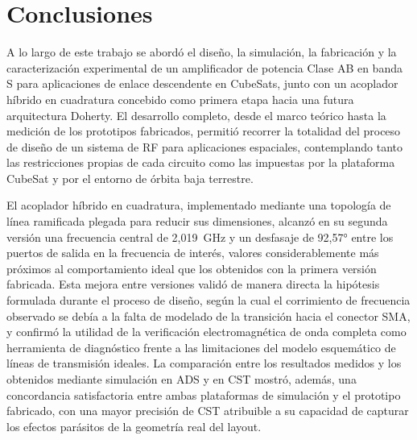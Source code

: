 \chapter[Conclusiones]{Conclusiones} \label{cp:conclusiones}

A lo largo de este trabajo se abordó el diseño, la simulación, la fabricación y la caracterización experimental de un amplificador de potencia Clase AB en banda S para aplicaciones de enlace descendente en CubeSats, junto con un acoplador híbrido en cuadratura concebido como primera etapa hacia una futura arquitectura Doherty. El desarrollo completo, desde el marco teórico hasta la medición de los prototipos fabricados, permitió recorrer la totalidad del proceso de diseño de un sistema de RF para aplicaciones espaciales, contemplando tanto las restricciones propias de cada circuito como las impuestas por la plataforma CubeSat y por el entorno de órbita baja terrestre.

El acoplador híbrido en cuadratura, implementado mediante una topología de línea ramificada plegada para reducir sus dimensiones, alcanzó en su segunda versión una frecuencia central de 2,019~GHz y un desfasaje de 92,57° entre los puertos de salida en la frecuencia de interés, valores considerablemente más próximos al comportamiento ideal que los obtenidos con la primera versión fabricada. Esta mejora entre versiones validó de manera directa la hipótesis formulada durante el proceso de diseño, según la cual el corrimiento de frecuencia observado se debía a la falta de modelado de la transición hacia el conector SMA, y confirmó la utilidad de la verificación electromagnética de onda completa como herramienta de diagnóstico frente a las limitaciones del modelo esquemático de líneas de transmisión ideales. La comparación entre los resultados medidos y los obtenidos mediante simulación en ADS y en CST mostró, además, una concordancia satisfactoria entre ambas plataformas de simulación y el prototipo fabricado, con una mayor precisión de CST atribuible a su capacidad de capturar los efectos parásitos de la geometría real del layout.

